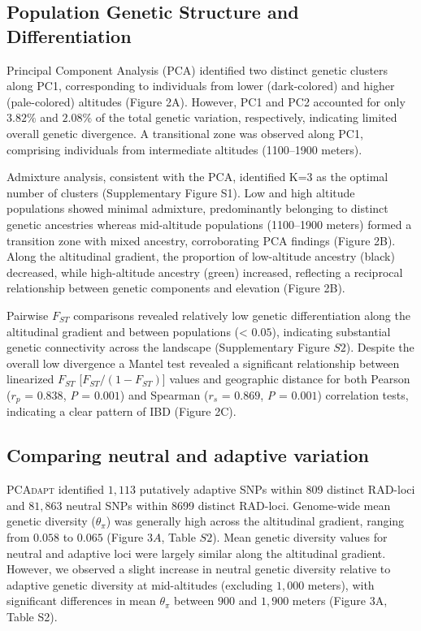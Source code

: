 \documentclass[9pt,a4paper,twoside]{rho-class/rho}
\begin{document}
    \subsection{Population Genetic Structure and Differentiation}

        Principal Component Analysis (PCA) identified two distinct genetic clusters along PC1, corresponding to individuals from lower (dark-colored) and higher (pale-colored) altitudes (Figure 2A). However, PC1 and PC2 accounted for only $3.82\%$ and $2.08\%$ of the total genetic variation, respectively, indicating limited overall genetic divergence. A transitional zone was observed along PC1, comprising individuals from intermediate altitudes (1100–1900 meters).
        
        Admixture analysis, consistent with the PCA, identified K=3 as the optimal number of clusters (Supplementary Figure S1). Low and high altitude populations showed minimal admixture, predominantly belonging to distinct genetic ancestries whereas mid-altitude populations (1100–1900 meters) formed a transition zone with mixed ancestry, corroborating PCA findings (Figure 2B). Along the altitudinal gradient, the proportion of low-altitude ancestry (black) decreased, while high-altitude ancestry (green) increased, reflecting a reciprocal relationship between genetic components and elevation (Figure 2B).

        Pairwise $F_{ST}$ comparisons revealed relatively low genetic differentiation along the altitudinal gradient and between populations (< $0.05$), indicating substantial genetic connectivity across the landscape (Supplementary Figure $S2$). Despite the overall low divergence a Mantel test revealed a significant relationship between linearized $F_{ST}$  [$F_{ST}/(1 - F_{ST})$] values and geographic distance for both Pearson (\textit{$r_p$} = $0.838$, \textit{P} = $0.001$) and Spearman (\textit{$r_s$} = $0.869$, \textit{P} = $0.001$) correlation tests, indicating a clear pattern of IBD (Figure 2C).

    \subsection{Comparing neutral and adaptive variation}

        \textsc{PCAdapt} identified $1,113$ putatively adaptive SNPs within 809 distinct RAD-loci and $81,863$ neutral SNPs within 8699 distinct RAD-loci. Genome-wide mean genetic diversity ($\theta_\pi$) was generally high across the altitudinal gradient, ranging from $0.058$ to $0.065$ (Figure $3A$, Table $S2$). Mean genetic diversity values for neutral and adaptive loci were largely similar along the altitudinal gradient. However, we observed a slight increase in neutral genetic diversity relative to adaptive genetic diversity at mid-altitudes (excluding $1,000$ meters), with significant differences in mean $\theta_\pi$ between $900$ and $1,900$ meters (Figure 3A, Table S2).
    
\end{document}

